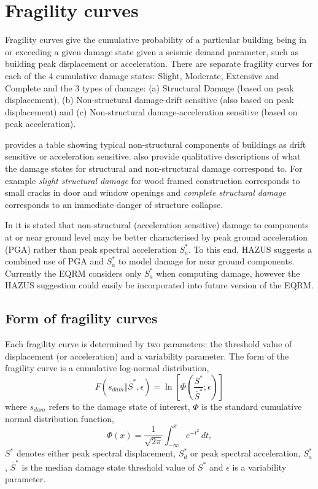 \section{Fragility curves}

Fragility curves give the cumulative probability of a particular
building being in or exceeding a given damage state given  a
seismic demand parameter, such as building peak
displacement or acceleration. There are
separate fragility curves for each of the
4 cumulative damage states: Slight, Moderate, Extensive and
Complete and the 3 types of damage: (a) Structural Damage (based
on peak displacement), (b) Non-structural
damage-drift sensitive (also based on peak displacement) and (c) Non-structural damage-acceleration
sensitive (based on peak acceleration).

\citet[page 5-12, Table 5.2]{dr_FEMA99b} provides a table showing
typical non-structural components of buildings as drift sensitive
or acceleration sensitive. \citet[page 5-13 to 5-23]{dr_FEMA99b}
also provide qualitative descriptions of what the damage states
for structural and non-structural damage correspond to. For
example \textit{slight structural damage} for wood framed
construction corresponds to small cracks in door and window
openings and \textit{complete structural damage} corresponds to an
immediate danger of structure collapse.

In \citet[pages 5-19]{dr_FEMA99b} it is stated that non-structural
(acceleration sensitive) damage to components at or near ground
level may be better characterised by peak ground acceleration
(PGA) rather than peak spectral acceleration $S^*_a$. To this end,
HAZUS suggests a combined use of PGA and $S^*_a$ to model damage
for near ground components. Currently the EQRM considers only
$S^*_a$ when computing damage, however the HAZUS suggestion could
easily be incorporated into future version of the EQRM.


\subsection{Form of fragility curves}

Each fragility curve is determined by two
parameters: the threshold value of displacement (or acceleration)
and a variability parameter. The form of the fragility
curve is a cumulative log-normal
distribution,
\begin{equation}
\label{eq:vdamage-frag} F(s_{dam} \Vert \bar S^*,\epsilon) =
\ln\left[\Phi\left(\frac{S^*}{\bar S^*}; \epsilon\right)\right]
\end{equation}
where $s_{dam}$ refers to the damage state of interest, $\Phi$ is
the standard cumulative normal distribution function,
$$
 \Phi(x) = \frac{1}{\sqrt{2\pi}}\int_{-\infty}^x e^{-t^2}\,dt,
$$
$S^*$ denotes either peak spectral displacement, $S_d^*$ or peak spectral acceleration,
$S_a^*$, $\bar S^*$ is the median damage state threshold value of
$S^*$ and $\epsilon$ is a variability parameter.


